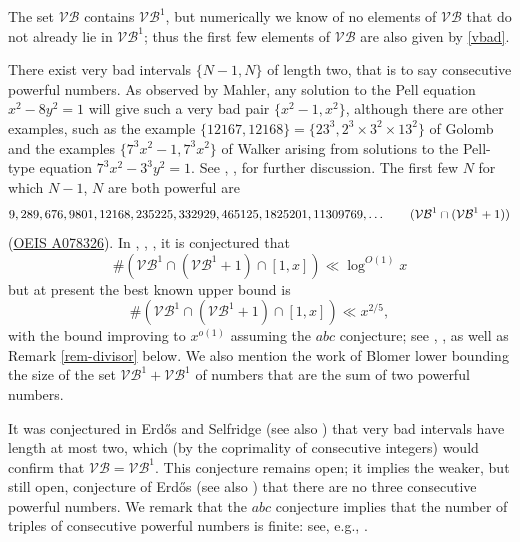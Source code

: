 \documentclass[12pt]{amsart}
\begin{document}
The set $\mathcal{VB}$ contains $\mathcal{VB}^1$, but numerically we know of no elements of $\mathcal{VB}$ that do not already lie in $\mathcal{VB}^1$; thus the first few elements of $\mathcal{VB}$ are also given by \eqref{vbad}.

There exist very bad intervals $\{N-1,N\}$ of length two, that is to say consecutive powerful numbers.  As observed by Mahler, any solution to the Pell equation $x^2-8y^2=1$ will give such a very bad pair $\{x^2-1,x^2\}$, although there are other examples, such as the example $\{12167, 12168\} = \{23^3, 2^3 \times 3^2 \times 13^2\}$ of Golomb \cite{golomb} and the examples $\{ 7^3 x^2-1, 7^3 x^2\}$ of Walker \cite{walker} arising from solutions to the Pell-type equation $7^3 x^2 - 3^3 y^2 = 1$.  See \cite[p.31]{erdos76}, \cite[p. 80]{eg}, \cite[Problem \#365]{bloom} for further discussion.  The first few $N$ for which $N-1$, $N$ are both powerful are
\begin{equation}
9, 289, 676, 9801, 12168, 235225, 332929, 465125, 1825201, 11309769, \dots \tag{$\mathcal{VB}^1 \cap (\mathcal{VB}^1+1)$}
\end{equation}
 (\href{https://oeis.org/A078326}{OEIS A078326}). In \cite[p. 31]{erdos-consecutive}, \cite[p. 234]{ribenboim}, \cite[p. 68]{eg}, \cite[Problem \#365]{bloom} it is conjectured that
\begin{equation}\label{erd-consec}
 \#(\mathcal{VB}^1 \cap (\mathcal{VB}^1+1) \cap [1,x]) \ll \log^{O(1)} x
\end{equation}
but at present the best known upper bound is
\begin{equation}\label{vbvb}
 \#(\mathcal{VB}^1 \cap (\mathcal{VB}^1+1) \cap [1,x]) \ll x^{2/5},
\end{equation}
with the bound improving to $x^{o(1)}$ assuming the $abc$ conjecture; see \cite{aktas}, \cite{chan}, as well as Remark \ref{rem-divisor} below. We also mention the work of Blomer \cite{blomer} lower bounding the size of the set $\mathcal{VB}^1 + \mathcal{VB}^1$ of numbers that are the sum of two powerful numbers.

 It was conjectured in Erd\H{o}s and Selfridge \cite[p. 73]{erdos-graham} (see also \cite[Problem \#137]{bloom}) that very bad intervals have length at most two, which (by the coprimality of consecutive integers) would confirm that $\mathcal{VB} = \mathcal{VB}^1$.  This conjecture remains open; it implies the weaker, but still open, conjecture of Erd\H{o}s \cite{erdos76} (see also \cite[Problem \#364]{bloom}) that there are no three consecutive powerful numbers.  We remark that the $abc$ conjecture implies that the number of triples of consecutive powerful numbers is finite: see, e.g., \cite[Exercise 1.3.6]{murty}.
\end{document}

